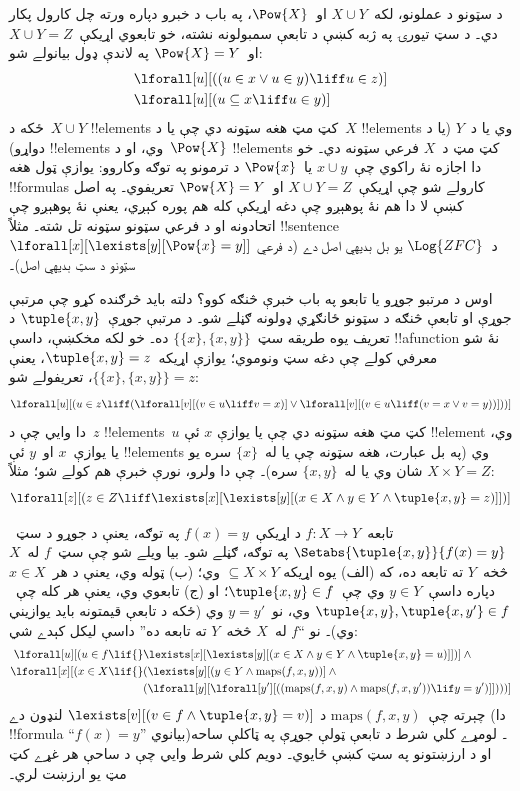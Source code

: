 \documentclass[../../../include/open-logic-section]{subfiles}
\begin{document}
د سټونو د عملونو، لکه~$X \cup Y$ او~$\Pow{X}$، په باب د خبرو دپاره
ورته چل کارول پکار دي۔ د سټ تيورۍ په ژبه کښې د تابعې سمبولونه نشته،
خو تابعوي اړيکې~$X \cup Y = Z$ او~$\Pow{X} = Y$ په لاندې ډول
بيانولے شو:
\begin{align*}
& \lforall[u][((u \in x \lor u \in y) \liff u \in z)]\\
& \lforall[u][(u \subseteq x \liff u \in y )]
\end{align*}
ځکه د~$X \cup Y$ !!{element}s کټ مټ هغه سټونه دي چې يا د~$X$
!!{element}s وي يا د~$Y$ (يا د دواړو) !!{element}s وي، او د~$\Pow{X}$
!!{element}s کټ مټ
د~$X$ فرعي سټونه دي۔ خو دا اجازه نۀ راکوي چې~$x \cup y$ يا~$\Pow{x}$
د ترمونو په توګه وکاروو: يوازې ټول هغه !!{formula}s کارولے شو چې
اړيکې~$X \cup Y = Z$ او~$\Pow{X} = Y$ تعريفوي۔ په اصل کښې لا دا هم
نۀ پوهېږو چې دغه اړيکې کله هم پوره کېږي، يعنې نۀ پوهېږو چې اتحادونه
او د فرعي سټونو سټونه تل شته۔ مثلاً !!{sentence}
$\lforall[x][\lexists[y][\Pow{x} = y]]$ د~$\Log{ZFC}$ يو بل بديهي
اصل دے (د فرعي سټونو د سټ بديهي اصل)۔

اوس د مرتبو جوړو يا تابعو په باب خبرې څنګه کوو؟ دلته بايد څرګنده کړو
چې مرتبې جوړې او تابعې څنګه د سټونو ځانګړي ډولونه ګڼلے شو۔ د مرتبې
جوړې~$\tuple{x, y}$ د تعريف يوه طريقه سټ~$\{\{x\}, \{x, y\}\}$ ده۔
خو لکه مخکښې، داسې !!a{function} نۀ شو معرفي کولے چې دغه سټ ونوموي؛
يوازې اړيکه~$\tuple{x, y} = z$، يعنې
$\{\{x\}, \{x, y\}\} = z$، تعريفولے شو:
\[
\lforall[u][(u \in z \liff (\lforall[v][(v \in u \liff v = x)] \lor
  \lforall[v][(v \in u \liff (v = x \lor v = y))]))]
\]
دا وايي چې د~$z$ !!{element}s~$u$ کټ مټ هغه سټونه دي چې يا يوازې
$x$ ئې !!{element} وي، يا يوازې~$x$ او~$y$ ئې !!{element}s وي (په
بل عبارت، هغه سټونه چې يا له~$\{x\}$ سره يو شان وي يا
له~$\{x, y\}$ سره)۔ چې دا ولرو، نورې خبرې هم کولے شو؛ مثلاً
$X \times Y = Z$:
\[
\lforall[z][(z \in Z \liff \lexists[x][\lexists[y][(x \in
        X \land y \in Y \land \tuple{x, y} = z)]])]
\]

تابعه~$f \colon X \to Y$ د اړيکې~$f(x) = y$ په توګه، يعنې د جوړو
د سټ~$\Setabs{\tuple{x,y}}{f(x) = y}$ په توګه، ګڼلے شو۔ بيا ويلے شو
چې سټ~$f$ له~$X$ څخه~$Y$ ته تابعه ده، که (الف) يوه اړيکه
$\subseteq X \times Y$ وي؛ (ب) ټوله وي، يعنې د هر~$x \in X$ دپاره
داسې~$y \in Y$ وي چې~$\tuple{x, y} \in f$؛ او (ج) تابعوي وي، يعنې
هر کله چې~$\tuple{x, y}, \tuple{x, y'} \in f$ وي، نو~$y = y'$ وي
(ځکه د تابعې قيمتونه بايد يوازيني وي)۔ نو ``$f$ له~$X$ څخه~$Y$ ته
تابعه ده'' داسې ليکل کېدے شي:
\begin{align*}
 \lforall[u][(u \in f \lif {} & \lexists[x][\lexists[y][(x \in X \land y \in
      Y \land \tuple{x, y} = u)]])] \land {}\\
 \lforall[x][(x \in X \lif {} &
      (\lexists[y][(y \in Y \land \mathrm{maps}(f, x, y))] \land {}\\
& (\lforall[y][\lforall[y'][((\mathrm{maps}(f, x, y) \land
    \mathrm{maps}(f, x, y')) \lif y = y')]])))]
\end{align*}
چېرته چې~$\mathrm{maps}(f, x, y)$ د
$\lexists[v][(v \in f \land \tuple{x, y} = v)]$ لنډون دے (دا
!!{formula} ``$f(x) = y$'' بيانوي)۔
لومړے کلي شرط د تابعې ټولې جوړې په ټاکلې ساحه او د ارزښتونو په سټ کښې
ځايوي۔ دويم کلي شرط وايي چې د ساحې هر غړے کټ مټ يو ارزښت لري۔
\end{document}

